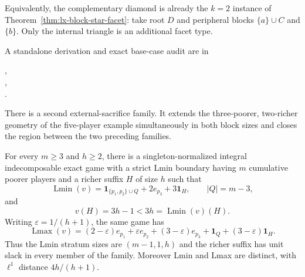 Equivalently, the complementary diamond is already the $k=2$ instance of
Theorem~\ref{thm:lx-block-star-facet}: take root $D$ and peripheral blocks
$\{a\}\cup C$ and $\{b\}$.  Only the internal triangle is an additional
facet type.

A standalone derivation and exact base-case audit are in
\begin{center}
\small{},\\[-2pt]
\small{},\\[-2pt]
\small{}.
\end{center}

There is a second external-sacrifice family.  It extends the three-poorer,
two-richer geometry of the five-player example simultaneously in both block
sizes and closes the region between the two preceding families.

\begin{theorem}
\label{thm:lx-three-poorer-family}
For every $m\geq3$ and $h\geq2$, there is a singleton-normalized integral
indecomposable exact game with a strict Lmin boundary having $m$ cumulative
poorer players and a richer suffix $H$ of size $h$ such that
\[
 \operatorname{Lmin}(v)
 =\mathbf1_{\{p_1,p_2\}\cup Q}+2e_{p_3}+3\mathbf1_H,
 \qquad |Q|=m-3,
\]
and
\[
 v(H)=3h-1<3h=\operatorname{Lmin}(v)(H).
\]
Writing $\varepsilon=1/(h+1)$, the same game has
\[
 \operatorname{Lmax}(v)
 =(2-\varepsilon)e_{p_1}+\varepsilon e_{p_2}
 +(3-\varepsilon)e_{p_3}+\mathbf1_Q
 +(3-\varepsilon)\mathbf1_H.                       \tag{TH-M}
 \label{eq:lx-three-poorer-lmax}
\]
Thus the Lmin stratum sizes are $(m-1,1,h)$ and the richer suffix has unit
slack in every member of the family.  Moreover Lmin and Lmax are distinct,
with $\ell^1$ distance $4h/(h+1)$.
\end{theorem}

